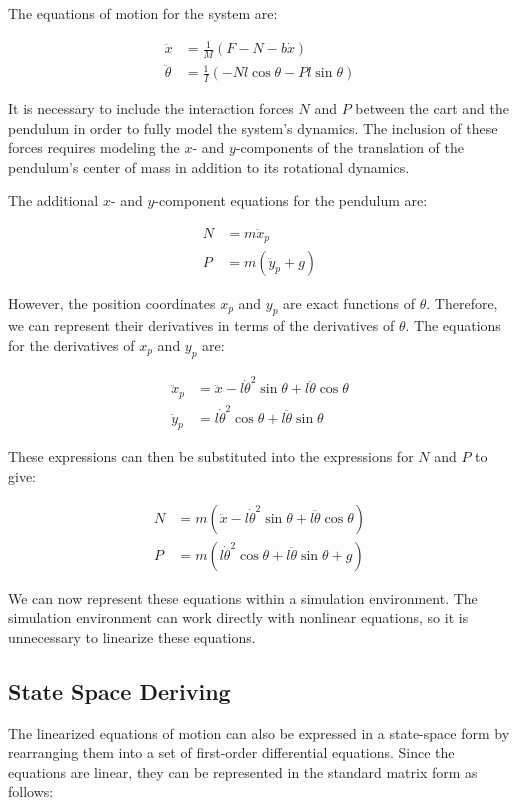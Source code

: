 \documentclass[11pt,twocolumn,twoside,lineno]{pnas-new}
\begin{document}
The equations of motion for the system are:

\begin{align}
\ddot{x} &= \frac{1}{M}(F - N - b\dot{x}) \\
\ddot{\theta} &= \frac{1}{I}(-Nl\cos\theta - Pl\sin\theta)
\end{align}

It is necessary to include the interaction forces \(N\) and \(P\) between the cart and the pendulum in order to fully model the system's dynamics. The inclusion of these forces requires modeling the \(x\)- and \(y\)-components of the translation of the pendulum's center of mass in addition to its rotational dynamics.

The additional \(x\)- and \(y\)-component equations for the pendulum are:

\begin{align}
N &= m\ddot{x}_p \\
P &= m(\ddot{y}_p + g)
\end{align}

However, the position coordinates \(x_p\) and \(y_p\) are exact functions of \(\theta\). Therefore, we can represent their derivatives in terms of the derivatives of \(\theta\). The equations for the derivatives of \(x_p\) and \(y_p\) are:

\begin{align}
\ddot{x}_p &= \ddot{x} - l\dot{\theta}^2\sin\theta + l\ddot{\theta}\cos\theta \\
\ddot{y}_p &= l\dot{\theta}^2\cos\theta + l\ddot{\theta}\sin\theta
\end{align}

These expressions can then be substituted into the expressions for \(N\) and \(P\) to give:

\begin{align}
N &= m(\ddot{x} - l\dot{\theta}^2\sin\theta + l\ddot{\theta}\cos\theta) \\
P &= m(l\dot{\theta}^2\cos\theta + l\ddot{\theta}\sin\theta + g)
\end{align}

We can now represent these equations within a simulation environment. The simulation environment can work directly with nonlinear equations, so it is unnecessary to linearize these equations.

\subsection{State Space Deriving}
The linearized equations of motion can also be expressed in a state-space form by rearranging them into a set of first-order differential equations. Since the equations are linear, they can be represented in the standard matrix form as follows:
\end{document}
